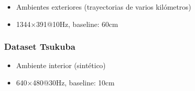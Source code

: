 \documentclass[compress]{beamer}
\begin{document}
\begin{frame}
	\begin{itemize}
        \item Ambientes exteriores (trayectorias de varios kilómetros)
        \item 1344$\times$391@10Hz, baseline: 60cm
    \end{itemize}

\end{frame}


\begin{frame}
	\frametitle{Dataset Tsukuba}

	\begin{figure}
		\hspace{0.2cm}
	\end{figure}
	
	\begin{itemize}
        \item Ambiente interior (sintético)
        \item 640$\times$480@30Hz, baseline: 10cm
    \end{itemize}
    
\end{frame}
\end{document}
